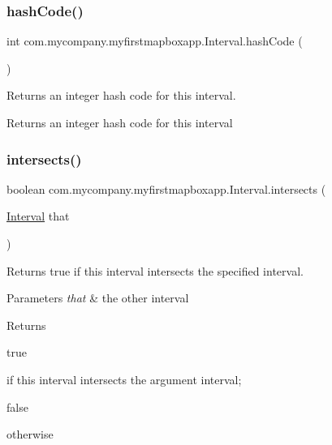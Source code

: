 \subsubsection{\texorpdfstring{hash\+Code()}{hashCode()}}
{\footnotesize\ttfamily int com.\+mycompany.\+myfirstmapboxapp.\+Interval.\+hash\+Code (\begin{DoxyParamCaption}{ }\end{DoxyParamCaption})\hspace{0.3cm}{\ttfamily [inline]}}

Returns an integer hash code for this interval.

\begin{DoxyReturn}{Returns}
an integer hash code for this interval 
\end{DoxyReturn}
\mbox{\label{classcom_1_1mycompany_1_1myfirstmapboxapp_1_1_interval_ac24fd0624aa6958bb802d1a0de58b1b3}} 
\subsubsection{\texorpdfstring{intersects()}{intersects()}}
{\footnotesize\ttfamily boolean com.\+mycompany.\+myfirstmapboxapp.\+Interval.\+intersects (\begin{DoxyParamCaption}\item[{\hyperlink{classcom_1_1mycompany_1_1myfirstmapboxapp_1_1_interval}{Interval}}]{that }\end{DoxyParamCaption})\hspace{0.3cm}{\ttfamily [inline]}}

Returns true if this interval intersects the specified interval.


\begin{DoxyParams}{Parameters}
{\em that} & the other interval \\
\hline
\end{DoxyParams}
\begin{DoxyReturn}{Returns}

\begin{DoxyCode}
\textcolor{keyword}{true} 
\end{DoxyCode}
 if this interval intersects the argument interval; 
\begin{DoxyCode}
\textcolor{keyword}{false} 
\end{DoxyCode}
 otherwise 
\end{DoxyReturn}
\mbox{\label{classcom_1_1mycompany_1_1myfirstmapboxapp_1_1_interval_a82f9eaa6872674e15cfa61c649d7820b}} 
